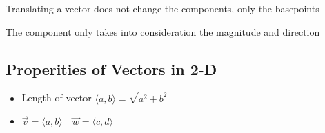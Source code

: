 \documentclass[hidelinks]{article}
\begin{document}
Translating a vector does not change the components, only the basepoints

The component only takes into consideration the magnitude and direction 
\subsection{Properities of Vectors in 2-D} 
\begin{itemize}
	\item Length of vector $\langle a, b \rangle = \sqrt{a^2+b^2}$
	\item $\vec{v} = \langle a, b \rangle \quad \vec{w} = \langle c, d \rangle$
\end{itemize}
\end{document}
